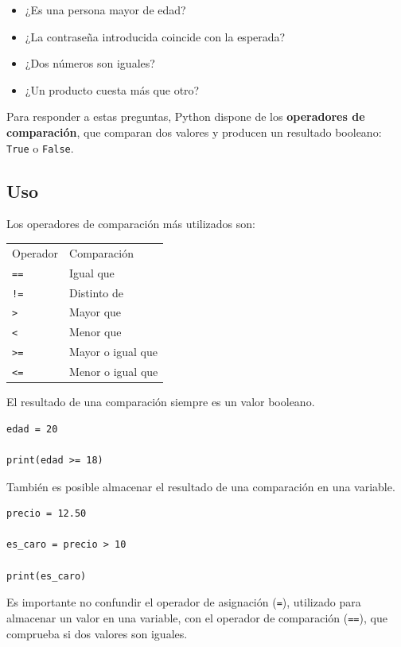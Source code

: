\documentclass[11pt,a5paper,twoside]{book}
\begin{document}
\begin{itemize}
\item  ¿Es una persona mayor de edad?
\item  ¿La contraseña introducida coincide con la esperada?
\item  ¿Dos números son iguales?
\item  ¿Un producto cuesta más que otro?
\end{itemize}
Para responder a estas preguntas, Python dispone de los \textbf{operadores de comparación}, que comparan dos valores y producen un resultado booleano: {\scriptsize \texttt{True}} o {\scriptsize \texttt{False}}.
\subsection{Uso}
Los operadores de comparación más utilizados son:

\newpage

\begin{tcolorbox}
\begin{tabular}{ll}
 Operador  &  Comparación        \\
 {\scriptsize \texttt{==}}      &  Igual que          \\
 {\scriptsize \texttt{!=}}      &  Distinto de        \\
 {\scriptsize \texttt{\textgreater{}}}       &  Mayor que          \\
 {\scriptsize \texttt{\textless{}}}       &  Menor que          \\
 {\scriptsize \texttt{\textgreater{}=}}      &  Mayor o igual que  \\
 {\scriptsize \texttt{\textless{}=}}      &  Menor o igual que  \\
\end{tabular}
\end{tcolorbox}
El resultado de una comparación siempre es un valor booleano.


\begin{tcolorbox}
\scriptsize
 \begin{verbatim}
edad = 20

print(edad >= 18)
\end{verbatim}
\end{tcolorbox}
También es posible almacenar el resultado de una comparación en una variable.


\begin{tcolorbox}
\scriptsize
 \begin{verbatim}
precio = 12.50

es_caro = precio > 10

print(es_caro)
\end{verbatim}
\end{tcolorbox}
Es importante no confundir el operador de asignación ({\scriptsize \texttt{=}}), utilizado para almacenar un valor en una variable, con el operador de comparación ({\scriptsize \texttt{==}}), que comprueba si dos valores son iguales.
\end{document}
